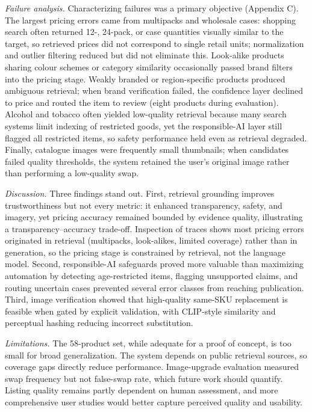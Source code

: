 \documentclass[conference]{IEEEtran}
\begin{document}
\textit{Failure analysis.} Characterizing failures was a primary objective
(Appendix C). The largest pricing errors came from multipacks and
wholesale cases: shopping search often returned 12-, 24-pack, or case quantities
visually similar to the target, so retrieved prices did not correspond to single
retail units; normalization and outlier filtering reduced but did not eliminate
this. Look-alike products sharing colour schemes or category similarity
occasionally passed brand filters into the pricing stage. Weakly branded or
region-specific products produced ambiguous retrieval; when brand verification
failed, the confidence layer declined to price and routed the item to review
(eight products during evaluation). Alcohol and tobacco often yielded
low-quality retrieval because many search systems limit indexing of restricted
goods, yet the responsible-AI layer still flagged all restricted items, so
safety performance held even as retrieval degraded. Finally, catalogue images
were frequently small thumbnails; when candidates failed quality thresholds, the
system retained the user's original image rather than performing a low-quality
swap.

\textit{Discussion.} Three findings stand out. First, retrieval grounding
improves trustworthiness but not every metric: it enhanced transparency, safety,
and imagery, yet pricing accuracy remained bounded by evidence quality,
illustrating a transparency--accuracy trade-off. Inspection of traces shows most
pricing errors originated in retrieval (multipacks, look-alikes, limited
coverage) rather than in generation, so the pricing stage is constrained by
retrieval, not the language model. Second, responsible-AI safeguards proved more
valuable than maximizing automation by detecting age-restricted items, flagging
unsupported claims, and routing uncertain cases prevented several error classes
from reaching publication. Third, image verification showed that high-quality
same-SKU replacement is feasible when gated by explicit validation, with
CLIP-style similarity and perceptual hashing reducing incorrect substitution.

\textit{Limitations.} The 58-product set, while adequate for a proof of concept,
is too small for broad generalization. The system depends on public retrieval
sources, so coverage gaps directly reduce performance. Image-upgrade evaluation
measured swap frequency but not false-swap rate, which future work should
quantify. Listing quality remains partly dependent on human assessment, and more
comprehensive user studies would better capture perceived quality and usability.
\end{document}
